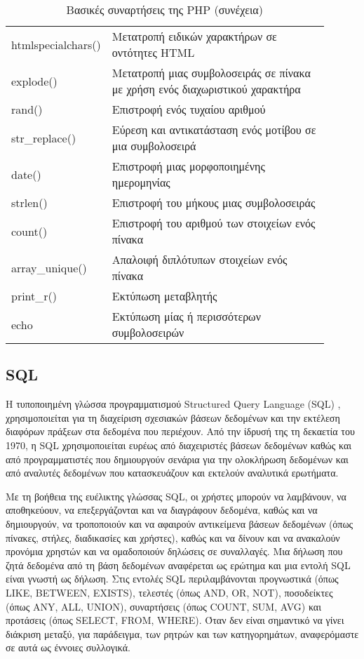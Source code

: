 \begin{longtable}{|p{0.2\linewidth}|p{0.7\linewidth}|} 
	\caption{Βασικές συναρτήσεις της PHP} \label{tbl:php_basic_functions} \\
	\hline
	\endfirsthead
	\caption[{}]{Βασικές συναρτήσεις της PHP (συνέχεια)} \\ 
	\endhead \endfoot 
	htmlspecialchars() & Μετατροπή ειδικών χαρακτήρων σε οντότητες HTML \\ \hline
	explode() & Μετατροπή μιας συμβολοσειράς σε πίνακα με χρήση ενός διαχωριστικού χαρακτήρα \\ \hline
	rand() & Επιστροφή ενός τυχαίου αριθμού \\ \hline
	str\_replace() & Εύρεση και αντικατάσταση ενός μοτίβου σε μια συμβολοσειρά \\ \hline
	date() & Επιστροφή μιας μορφοποιημένης ημερομηνίας \\ \hline
	strlen() & Επιστροφή του μήκους μιας συμβολοσειράς \\ \hline
	count() & Επιστροφή του αριθμού των στοιχείων ενός πίνακα \\ \hline
	array\_unique() & Απαλοιφή διπλότυπων στοιχείων ενός πίνακα \\ \hline
	print\_r() & Εκτύπωση μεταβλητής \\ \hline
	echo & Εκτύπωση μίας ή περισσότερων συμβολοσειρών \\ \hline
\end{longtable}

\subsection{SQL}
Η τυποποιημένη γλώσσα προγραμματισμού Structured Query Language (SQL) \cite{Loshin_2022}, χρησιμοποιείται για τη διαχείριση σχεσιακών βάσεων δεδομένων και την εκτέλεση διαφόρων πράξεων στα δεδομένα που περιέχουν. Από την ίδρυσή της τη δεκαετία του 1970, η SQL χρησιμοποιείται ευρέως από διαχειριστές βάσεων δεδομένων καθώς και από προγραμματιστές που δημιουργούν σενάρια για την ολοκλήρωση δεδομένων και από αναλυτές δεδομένων που κατασκευάζουν και εκτελούν αναλυτικά ερωτήματα.

Με τη βοήθεια της ευέλικτης γλώσσας SQL, οι χρήστες μπορούν να λαμβάνουν, να αποθηκεύουν, να επεξεργάζονται και να διαγράφουν δεδομένα, καθώς και να δημιουργούν, να τροποποιούν και να αφαιρούν αντικείμενα βάσεων δεδομένων (όπως πίνακες, στήλες, διαδικασίες και χρήστες), καθώς και να δίνουν και να ανακαλούν προνόμια χρηστών και να ομαδοποιούν δηλώσεις σε συναλλαγές. Μια δήλωση που ζητά δεδομένα από τη βάση δεδομένων αναφέρεται ως ερώτημα και μια εντολή SQL είναι γνωστή ως δήλωση. Στις εντολές SQL περιλαμβάνονται προγνωστικά (όπως LIKE, BETWEEN, EXISTS), τελεστές (όπως AND, OR, NOT), ποσοδείκτες (όπως ANY, ALL, UNION), συναρτήσεις (όπως COUNT, SUM, AVG) και προτάσεις (όπως SELECT, FROM, WHERE). Όταν δεν είναι σημαντικό να γίνει διάκριση μεταξύ, για παράδειγμα, των ρητρών και των κατηγορημάτων, αναφερόμαστε σε αυτά ως έννοιες συλλογικά.

